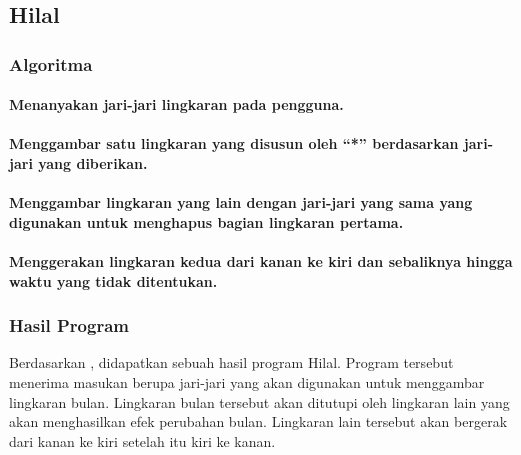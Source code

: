 \documentclass[../main.tex]{subfiles}
\begin{document}
    \subsection{Hilal}
    \subsubsection{Algoritma}
    \paragraph{Menanyakan jari-jari lingkaran pada pengguna.}
    \paragraph{Menggambar satu lingkaran yang disusun oleh ``*'' berdasarkan jari-jari yang diberikan.}
    \paragraph{Menggambar lingkaran yang lain dengan jari-jari yang sama yang digunakan untuk menghapus bagian lingkaran pertama.}
    \paragraph{Menggerakan lingkaran kedua dari kanan ke kiri dan sebaliknya hingga waktu yang tidak ditentukan.}
    \newpage
    \subsubsection{{\Flowchart}}
    \subsubsection{{\SourceCode}}
    \begin{indentlevel0}
        
    \end{indentlevel0}
    \subsubsection{Hasil Program}
    \begin{indentlevel0}
        \ilz{}Berdasarkan , didapatkan sebuah hasil program Hilal. Program tersebut menerima masukan berupa jari-jari yang akan digunakan untuk menggambar lingkaran bulan. Lingkaran bulan tersebut akan ditutupi oleh lingkaran lain yang akan menghasilkan efek perubahan bulan. Lingkaran lain tersebut akan bergerak dari kanan ke kiri setelah itu kiri ke kanan.
    \end{indentlevel0}
\end{document}
